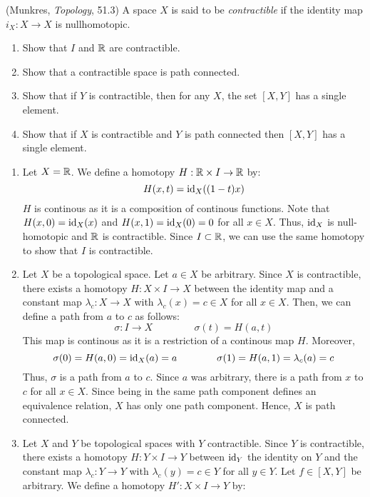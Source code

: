 \documentclass[12pt]{article}
\begin{document}
\begin{problab}{7}
(Munkres, \emph{Topology}, 51.3) A space $X$ is said to be \emph{contractible} if the identity map $i_X: X \to X$ is nullhomotopic. 
\begin{enumerate}
\item Show that $I$ and $\mathbb R$ are contractible.
\item Show that a contractible space is path connected.
\item Show that if $Y$ is contractible, then for any $X$, the set $[X,Y]$ has a single element.
\item Show that if $X$ is contractible and $Y$ is path connected then $[X,Y]$ has a single element. 
\end{enumerate}
\end{problab}
\begin{solu}
    \bbni
    \begin{enumerate}
        \item Let $X = \mathbb R$. We define a homotopy $H : \mathbb R \times I \to \mathbb R$ by: 
        \[  H(x, t) = \operatorname{id}_X((1-t)x) \]
        $H$ is continous as it is a composition of continous functions. Note that $H(x, 0) = \operatorname{id}_X(x)$ and $H(x, 1) = \operatorname{id}_X(0) = 0$ for all $x \in X$. Thus, $\operatorname{id}_X$ is null-homotopic and $\mathbb R$ is contractible. Since $I \subset \mathbb R$, we can use the same homotopy to show that $I$ is contractible. 
        \item Let $X$ be a topological space. Let $a \in X$ be arbitrary. Since $X$ is contractible, there exists a homotopy $H : X \times I \to X$ between the identity map and a constant map $\lambda_c: X \to X$ with $\lambda_c(x) = c \in X$ for all $x \in X$. Then, we can define a path from $a$ to $c$ as follows:  
        \[ \sigma: I \to X \qquad \qquad\,  \sigma(t) = H(a, t) \]
        This  map is continous as it is a restriction of a continous map $H$. Moreover, 
        \[ \sigma(0) = H(a, 0) = \operatorname{id}_X(a) = a \qquad \qquad \sigma(1) = H(a, 1) = \lambda_c(a) = c \]
        Thus, $\sigma$ is a path from $a$ to $c$. Since $a$ was arbitrary, there is a path from $x$ to $c$ for all $x \in X$. Since being in the same path component defines an equivalence relation, $X$ has only one path component. Hence, $X$ is path connected.
        \item Let $X$ and $Y$ be topological spaces with $Y$ contractible. Since $Y$ is contractible, there exists a homotopy $H: Y \times I \to Y$ between $\operatorname{id}_Y$ the identity on $Y$ and the constant map $\lambda_c: Y \to Y$ with $\lambda_c(y) = c \in Y$ for all $y \in Y$. Let $f \in [X,Y]$ be arbitrary. We define a homotopy $H': X \times I \to Y$ by:

\end{enumerate}
\end{solu}
\end{document}
